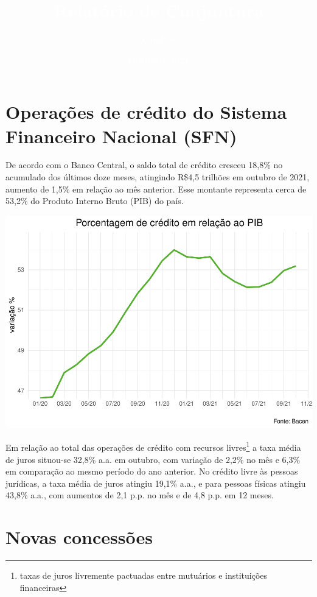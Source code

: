 \documentclass[100,a4paperpaper,]{article}
\title{\textbf{\textcolor{white}{Relatório de Conjuntura}}}
\author{\textbf{\textcolor{white}{Crédito}}}
\date{\textbf{\textcolor{white}{Outubro/2021}}}
\begin{document}
\renewcommand{\contentsname}{Sumário}


\maketitle
\tableofcontents
\clearpage

\section{Operações de crédito do Sistema Financeiro Nacional (SFN)} 
 \vspace{0.5cm}

De acordo com o Banco Central, o saldo total de crédito cresceu 18,8\%
no acumulado dos últimos doze meses, atingindo R\$4,5 trilhões em
outubro de 2021, aumento de 1,5\% em relação ao mês anterior. Esse
montante representa cerca de 53,2\% do Produto Interno Bruto (PIB) do
país.

\includegraphics{credito_files/figure-latex/credido e pib-1.pdf}

Em relação ao total das operações de crédito com recursos
livres\footnote{taxas de juros livremente pactuadas entre mutuários e instituições financeiras}
a taxa média de juros situou-se 32,8\% a.a. em outubro, com variação de
2,2\% no mês e 6,3\% em comparação ao mesmo período do ano anterior. No
crédito livre às pessoas jurídicas, a taxa média de juros atingiu 19,1\%
a.a., e para pessoas físicas atingiu 43,8\% a.a., com aumentos de 2,1
p.p. no mês e de 4,8 p.p. em 12 meses.

\newpage

\section{Novas concessões} 
 \vspace{0,15cm}
\end{document}
